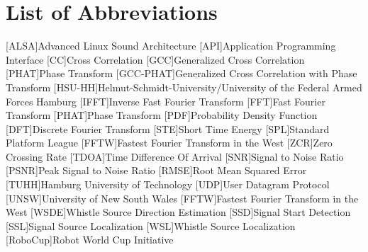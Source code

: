 \chapter*{List of Abbreviations}
\label{sec:abbreviations}

\begin{acronym}[HSU-HH]
  [ALSA]{Advanced Linux Sound Architecture}
  [API]{Application Programming Interface}
  [CC]{Cross Correlation}
  [GCC]{Generalized Cross Correlation}
  [PHAT]{Phase Transform}
  [GCC-PHAT]{Generalized Cross Correlation with Phase Transform}
  [HSU-HH]{Helmut-Schmidt-University/University of the Federal Armed Forces Hamburg}
  [IFFT]{Inverse Fast Fourier Transform}
  [FFT]{Fast Fourier Transform}
  [PHAT]{Phase Transform}
  [PDF]{Probability Density Function}
  [DFT]{Discrete Fourier Transform}
  [STE]{Short Time Energy}
  [SPL]{Standard Platform League}
  [FFTW]{Fastest Fourier Transform in the West}
  [ZCR]{Zero Crossing Rate}
  [TDOA]{Time Difference Of Arrival}
  [SNR]{Signal to Noise Ratio}
  [PSNR]{Peak Signal to Noise Ratio}
  [RMSE]{Root Mean Squared Error}
  [TUHH]{Hamburg University of Technology}
  [UDP]{User Datagram Protocol}
  [UNSW]{University of New South Wales}
  [FFTW]{Fastest Fourier Transform in the West}
  [WSDE]{Whistle Source Direction Estimation}
  [SSD]{Signal Start Detection}
  [SSL]{Signal Source Localization}
  [WSL]{Whistle Source Localization}
  [RoboCup]{Robot World Cup Initiative}
\end{acronym}
